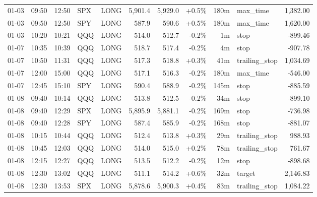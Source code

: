 \documentclass[11pt,a4paper,twoside]{article}
\begin{document}
\begin{center}
\begin{longtable}{>{\color{txtmain}}l l l l l r r r r >{\color{txtmain}}l r}
01-03 & 09:50 & 12:50 & SPX & LONG & 5,901.4 & 5,929.0 & \textcolor{wingreen}{+0.5\%} & 180m & max\_time & \textcolor{wingreen}{1,382.00} \\
01-03 & 09:50 & 12:50 & SPY & LONG & 587.9 & 590.6 & \textcolor{wingreen}{+0.5\%} & 180m & max\_time & \textcolor{wingreen}{1,620.00} \\
01-03 & 10:20 & 10:21 & QQQ & LONG & 514.0 & 512.7 & \textcolor{lossred}{-0.2\%} & 1m & stop & \textcolor{lossred}{-899.46} \\
01-07 & 10:35 & 10:39 & QQQ & LONG & 518.7 & 517.4 & \textcolor{lossred}{-0.2\%} & 4m & stop & \textcolor{lossred}{-907.78} \\
01-07 & 10:50 & 11:31 & QQQ & LONG & 517.3 & 518.8 & \textcolor{wingreen}{+0.3\%} & 41m & trailing\_stop & \textcolor{wingreen}{1,034.69} \\
01-07 & 12:00 & 15:00 & QQQ & LONG & 517.1 & 516.3 & \textcolor{lossred}{-0.2\%} & 180m & max\_time & \textcolor{lossred}{-546.00} \\
01-07 & 12:45 & 15:10 & SPY & LONG & 590.4 & 588.9 & \textcolor{lossred}{-0.2\%} & 145m & stop & \textcolor{lossred}{-885.59} \\
01-08 & 09:40 & 10:14 & QQQ & LONG & 513.8 & 512.5 & \textcolor{lossred}{-0.2\%} & 34m & stop & \textcolor{lossred}{-899.10} \\
01-08 & 09:40 & 12:29 & SPX & LONG & 5,895.9 & 5,881.1 & \textcolor{lossred}{-0.2\%} & 169m & stop & \textcolor{lossred}{-736.98} \\
01-08 & 09:40 & 12:28 & SPY & LONG & 587.4 & 585.9 & \textcolor{lossred}{-0.2\%} & 168m & stop & \textcolor{lossred}{-881.07} \\
01-08 & 10:15 & 10:44 & QQQ & LONG & 512.4 & 513.8 & \textcolor{wingreen}{+0.3\%} & 29m & trailing\_stop & \textcolor{wingreen}{988.93} \\
01-08 & 10:45 & 12:03 & QQQ & LONG & 514.0 & 515.0 & \textcolor{wingreen}{+0.2\%} & 78m & trailing\_stop & \textcolor{wingreen}{761.67} \\
01-08 & 12:15 & 12:27 & QQQ & LONG & 513.5 & 512.2 & \textcolor{lossred}{-0.2\%} & 12m & stop & \textcolor{lossred}{-898.68} \\
01-08 & 12:30 & 13:02 & QQQ & LONG & 511.1 & 514.2 & \textcolor{wingreen}{+0.6\%} & 32m & target & \textcolor{wingreen}{2,146.83} \\
01-08 & 12:30 & 13:53 & SPX & LONG & 5,878.6 & 5,900.3 & \textcolor{wingreen}{+0.4\%} & 83m & trailing\_stop & \textcolor{wingreen}{1,084.22} \\

\end{longtable}
\end{center}
\end{document}
